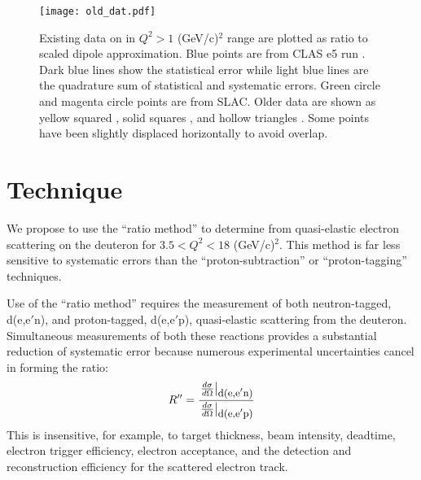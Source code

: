 \documentclass[12pt,letterpaper,oneside]{article}
\begin{document}
\begin{figure}
\texttt{[image: old\_dat.pdf]}\\
\caption{\label{old_data}
Existing data on \gmn in $Q^2>1$ (GeV/c)$^2$ range are plotted  as ratio to
scaled dipole approximation.  Blue points are from CLAS e5 run
\cite{Will,Jeff}.  Dark blue lines show the statistical error while
light blue lines
are the quadrature sum of statistical and systematic errors.  Green circle
\cite{SLAC_Rock} and magenta circle \cite{sub5}
points are from SLAC. Older data are shown as yellow squared
\cite{rat2}, solid squares \cite{tag2}, and hollow triangles \cite{sub4}.
Some points have been slightly displaced horizontally to avoid overlap.}
\end{figure}


\section{Technique}
We propose to use the ``ratio method''\cite{Durand} to determine \gmn from
quasi-elastic electron scattering on the deuteron for $3.5 < Q^2 < 18$
(GeV/c)$^2$.  This method is far less sensitive to systematic errors than
the ``proton-subtraction'' or ``proton-tagging'' techniques. 

Use of the ``ratio method'' requires the measurement of both
neutron-tagged, d(e,e$'$n), and proton-tagged, d(e,e$'$p), quasi-elastic
scattering from the deuteron.  Simultaneous measurements of both
these reactions provides a substantial reduction of systematic error
because numerous experimental uncertainties 
cancel in forming the ratio:
\begin{equation}
R''=\frac{\left.\frac{d\sigma}{d\Omega}\right|_{\mbox{\small d(e,e$'$n)}}
}{\left.\frac{d\sigma}{d\Omega}\right|_{\mbox{\small d(e,e$'$p)}}}
\label{r-double-prime-eqn}
\end{equation}
This is insensitive, for example, to target thickness, beam intensity,
deadtime, electron trigger efficiency, electron acceptance, and the 
detection and reconstruction efficiency for the scattered electron track.
\end{document}
